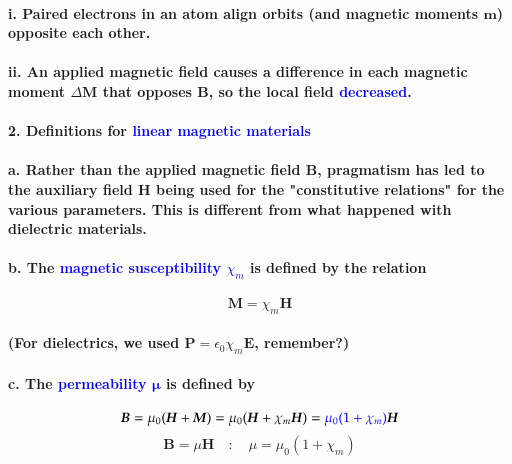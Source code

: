 \documentclass{article}
\begin{document}
\paragraph{\indent\indent i. Paired electrons in an atom align orbits (and magnetic moments $\boldsymbol{m}$) opposite each other.}
\paragraph{\indent\indent ii. An applied magnetic field causes a difference in each magnetic moment $\Delta\boldsymbol{M}$ that opposes $\boldsymbol{B}$, so the local field \textcolor{blue}{decreased}.}
\paragraph{2. Definitions for \textcolor{blue}{linear magnetic materials}}
\paragraph{\indent a. Rather than the applied magnetic field $\boldsymbol{B}$, pragmatism has led to the auxiliary field $\boldsymbol{H}$ being used for the "constitutive relations" for the various parameters. This is different from what happened with dielectric materials.}
\paragraph{\indent b. The \textcolor{blue}{magnetic susceptibility $\chi_m$} is defined by the relation}
\begin{equation*}
    \boldsymbol{M}=\chi_m\boldsymbol{H}
\end{equation*}
\paragraph{(For dielectrics, we used $\boldsymbol{P}=\epsilon_0\chi_m\boldsymbol{E}$, remember?)}
\paragraph{\indent c. The \textcolor{blue}{permeability $\boldsymbol{\mu}$} is defined by}
\begin{equation*}
    \boldsymbol{B}=\mu_0(\boldsymbol{H}+\boldsymbol{M})=\mu_0(\boldsymbol{H}+\chi_m\boldsymbol{H})=\textcolor{blue}{\mu_0(1+\chi_m)}\boldsymbol{H}
\end{equation*} 
\begin{equation*}
    \boldsymbol{B}=\mu\boldsymbol{H}\quad :\quad \mu=\mu_0(1+\chi_m)
\end{equation*}
\end{document}
